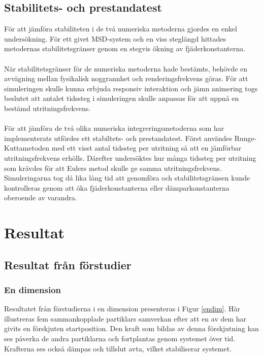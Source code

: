 \documentclass[a4paper,12pt,oneside,final,swedish]{extarticle}
\begin{document}
\subsection{Stabilitets- och prestandatest}
För att jämföra stabiliteten i de två numeriska metoderna gjordes en enkel undersökning. För ett givet MSD-system och en viss steglängd hittades metodernas stabilitetsgränser genom en stegvis ökning av fjäderkonstanterna.
\\\\När stabilitetsgränser för de numeriska metoderna hade bestämts, behövde en avvägning mellan fysikalisk noggrannhet och renderingsfrekvens göras. För att simuleringen skulle kunna erbjuda responsiv interaktion och jämn animering togs beslutet att antalet tidssteg i simuleringen skulle anpassas för att uppnå en bestämd utritningsfrekvens.
\\\\För att jämföra de två olika numeriska integreringsmetoderna som har implementerats utfördes ett stabiltets- och prestandatest. Först användes Runge-Kuttametoden med ett visst antal tidssteg per utritning så att en jämförbar utritningsfrekvens erhölls. Därefter undersöktes hur många tidssteg per utritning som krävdes för att Eulers metod skulle ge samma utritningsfrekvens. Simuleringarna tog då lika lång tid att genomföra och stabilitetsgränsen kunde kontrolleras genom att öka fjäderkonstanterna eller dämparkonstanterna oberoende av varandra.
\section{Resultat}
\subsection{Resultat från förstudier}

\subsubsection{En dimension}
Resultatet från förstudierna i en dimension presenteras i Figur \ref{endim}. Här illustreras fem sammankopplade partiklars samverkan efter att en av dem har givits en förskjuten startposition. Den kraft som bildas av denna förskjutning kan ses påverka de andra partiklarna och fortplantas genom systemet över tid. Krafterna ses också dämpas och tillslut avta, vilket stabiliserar systemet.
\end{document}
